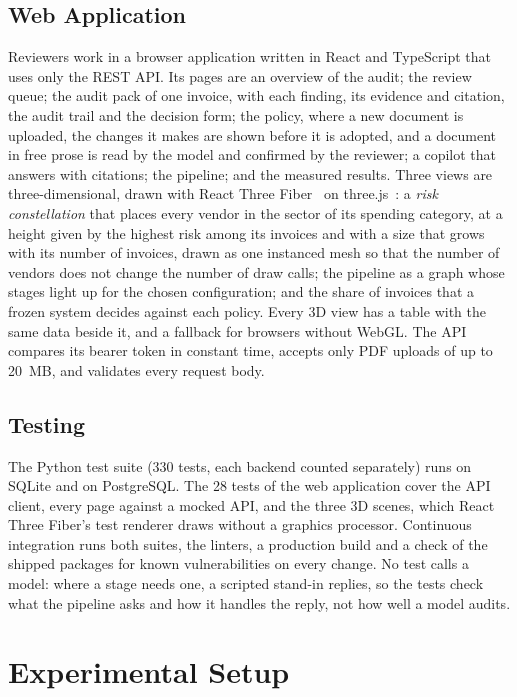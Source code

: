 \documentclass[conference]{IEEEtran}
\begin{document}
\subsection{Web Application}
\label{sec:web}
Reviewers work in a browser application written in React and TypeScript that uses only the REST API. Its pages are an overview of the audit; the review queue; the audit pack of one invoice, with each finding, its evidence and citation, the audit trail and the decision form; the policy, where a new document is uploaded, the changes it makes are shown before it is adopted, and a document in free prose is read by the model and confirmed by the reviewer; a copilot that answers with citations; the pipeline; and the measured results. Three views are three-dimensional, drawn with React Three Fiber~\cite{r3f} on three.js~\cite{threejs}: a \emph{risk constellation} that places every vendor in the sector of its spending category, at a height given by the highest risk among its invoices and with a size that grows with its number of invoices, drawn as one instanced mesh so that the number of vendors does not change the number of draw calls; the pipeline as a graph whose stages light up for the chosen configuration; and the share of invoices that a frozen system decides against each policy. Every 3D view has a table with the same data beside it, and a fallback for browsers without WebGL. The API compares its bearer token in constant time, accepts only PDF uploads of up to 20~MB, and validates every request body.

\subsection{Testing}
The Python test suite (330 tests, each backend counted separately) runs on SQLite and on PostgreSQL. The 28 tests of the web application cover the API client, every page against a mocked API, and the three 3D scenes, which React Three Fiber's test renderer draws without a graphics processor. Continuous integration runs both suites, the linters, a production build and a check of the shipped packages for known vulnerabilities on every change. No test calls a model: where a stage needs one, a scripted stand-in replies, so the tests check what the pipeline asks and how it handles the reply, not how well a model audits.

\section{Experimental Setup}
\label{sec:setup}
\end{document}

